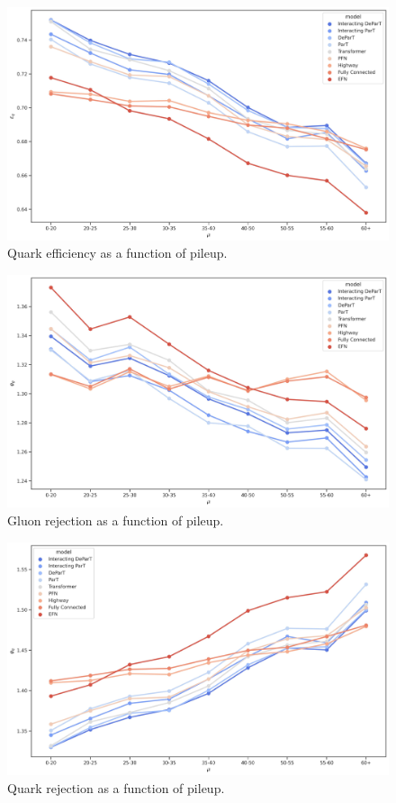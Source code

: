 \begin{figure}[htb]
    \centering
    \includegraphics[width=0.95\linewidth]{src/plots/results/mu_dep/quark_efficiency.jpg}
    \caption{Quark efficiency as a function of pileup.}
    \label{fig:quark_eff_pileup}
\end{figure}

\begin{figure}[htb]
    \centering
    \includegraphics[width=0.95\linewidth]{src/plots/results/mu_dep/gluon_rejection.jpg}
    \caption{Gluon rejection as a function of pileup.}
    \label{fig:gluon_rej_pileup}
\end{figure}

\begin{figure}[htb]
    \centering
    \includegraphics[width=0.95\linewidth]{src/plots/results/mu_dep/quark_rejection.jpg}
    \caption{Quark rejection as a function of pileup.}
    \label{fig:quark_rej_pileup}
\end{figure}

